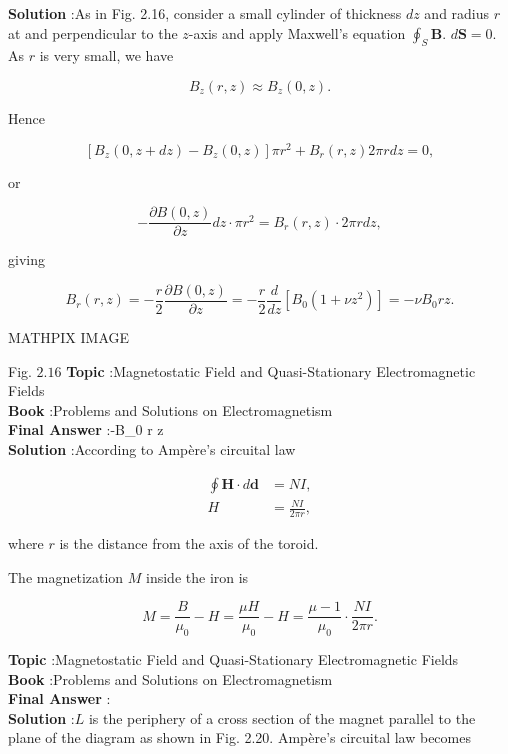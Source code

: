 \documentclass[10pt]{article}
\begin{document}
\textbf{Solution} :As in Fig. 2.16, consider a small cylinder of thickness $d z$ and radius $r$ at and perpendicular to the $z$-axis and apply Maxwell's equation $\oint_{S} \mathbf{B}$. $d \mathbf{S}=0$. As $r$ is very small, we have

$$
B_{z}(r, z) \approx B_{z}(0, z) .
$$

Hence

$$
\left[B_{z}(0, z+d z)-B_{z}(0, z)\right] \pi r^{2}+B_{r}(r, z) 2 \pi r d z=0,
$$

or

$$
-\frac{\partial B(0, z)}{\partial z} d z \cdot \pi r^{2}=B_{r}(r, z) \cdot 2 \pi r d z,
$$

giving

$$
B_{r}(r, z)=-\frac{r}{2} \frac{\partial B(0, z)}{\partial z}=-\frac{r}{2} \frac{d}{d z}\left[B_{0}\left(1+\nu z^{2}\right)\right]=-\nu B_{0} r z .
$$



MATHPIX IMAGE

Fig. $2.16$
\textbf{Topic} :Magnetostatic Field and Quasi-Stationary Electromagnetic Fields\\
\textbf{Book} :Problems and Solutions on Electromagnetism\\
\textbf{Final Answer} :-\nu B_{0} r z\\


\textbf{Solution} :According to Ampère's circuital law

$$
\begin{aligned}
\oint \mathbf{H} \cdot d \boldsymbol{d} &=N I, \\
H &=\frac{N I}{2 \pi r},
\end{aligned}
$$

where $r$ is the distance from the axis of the toroid.

The magnetization $M$ inside the iron is

$$
M=\frac{B}{\mu_{0}}-H=\frac{\mu H}{\mu_{0}}-H=\frac{\mu-1}{\mu_{0}} \cdot \frac{N I}{2 \pi r} .
$$

\textbf{Topic} :Magnetostatic Field and Quasi-Stationary Electromagnetic Fields\\
\textbf{Book} :Problems and Solutions on Electromagnetism\\
\textbf{Final Answer} : \cdot {}\\


\textbf{Solution} :$L$ is the periphery of a cross section of the magnet parallel to the plane of the diagram as shown in Fig. 2.20. Ampère's circuital law becomes
\end{document}
